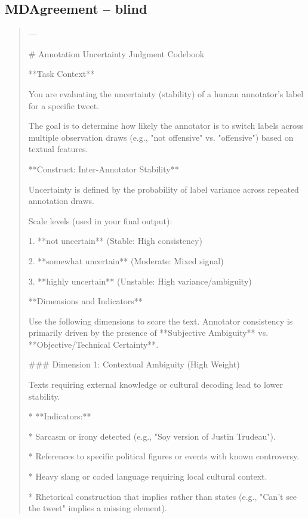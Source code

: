 \subsection*{MDAgreement -- blind}
\begin{quote}\small
---



# Annotation Uncertainty Judgment Codebook



**Task Context**

You are evaluating the uncertainty (stability) of a human annotator's label for a specific tweet.

The goal is to determine how likely the annotator is to switch labels across multiple observation draws (e.g., "not offensive" vs. "offensive") based on textual features.



**Construct: Inter-Annotator Stability**

Uncertainty is defined by the probability of label variance across repeated annotation draws.

Scale levels (used in your final output):

1. **not uncertain** (Stable: High consistency)

2. **somewhat uncertain** (Moderate: Mixed signal)

3. **highly uncertain** (Unstable: High variance/ambiguity)



**Dimensions and Indicators**

Use the following dimensions to score the text. Annotator consistency is primarily driven by the presence of **Subjective Ambiguity** vs. **Objective/Technical Certainty**.



### Dimension 1: Contextual Ambiguity (High Weight)

Texts requiring external knowledge or cultural decoding lead to lower stability.

*   **Indicators:**

    *   Sarcasm or irony detected (e.g., "Soy version of Justin Trudeau").

    *   References to specific political figures or events with known controversy.

    *   Heavy slang or coded language requiring local cultural context.

    *   Rhetorical construction that implies rather than states (e.g., "Can't see the tweet" implies a missing element).


\end{quote}
